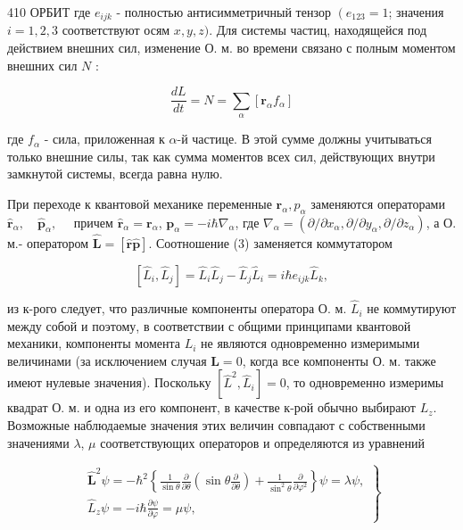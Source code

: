 \documentclass[10pt]{article}
\begin{document}
410 ОРБИТ где $e_{i j k}$ - полностью антисимметричный тензор $\left(e_{123}=1\right.$; значения $i=1,2,3$ соответствуют осям $x, y, z)$. Для системы частиц, находящейся под действием внешних сил, изменение О. м. во времени связано с полным моментом внешних сил $N$ :



\[

\frac{d L}{d t}=N=\sum_{\alpha}\left[\boldsymbol{r}_{\alpha} f_{\alpha}\right]

\]



где $f_{\alpha}$ - сила, приложенная к $\alpha$-й частице. В этой сумме должны учитываться только внешние силы, так как сумма моментов всех сил, действующих внутри замкнутой системы, всегда равна нулю.



При переходе к квантовой механике переменные $\boldsymbol{r}_{\alpha}, p_{\alpha}$ заменяются операторами $\hat{\boldsymbol{r}}_{\alpha}, \quad \hat{\boldsymbol{p}}_{\alpha}, \quad$ причем $\hat{\boldsymbol{r}}_{\alpha}=\boldsymbol{r}_{\alpha}$, $\boldsymbol{p}_{\alpha}=-i \hbar \nabla_{\alpha}$, где $\nabla_{\alpha}=\left(\partial / \partial x_{\alpha}, \partial / \partial y_{\alpha}, \partial / \partial z_{\alpha}\right)$, а О. м.- оператором $\hat{\boldsymbol{L}}=[\hat{\boldsymbol{r}} \hat{\boldsymbol{p}}]$. Соотношение (3) заменяется коммутатором



\[

\left[\hat{L}_{i}, \hat{L}_{j}\right]=\hat{L}_{i} \hat{L}_{j}-\hat{L}_{j} \hat{L}_{i}=i \hbar e_{i j k} \hat{L}_{k},

\]



из к-рого следует, что различные компоненты оператора О. м. $\hat{L}_{i}$ не коммутируют между собой и поэтому, в соответствии с общими принципами квантовой механики, компоненты момента $L_{i}$ не являются одновременно измеримыми величинами (за исключением случая $\boldsymbol{L}=0$, когда все компоненты О. м. также имеют нулевые значения). Поскольку $\left[\hat{L}^{2}, \hat{L}_{i}\right]=0$, то одновременно измеримы квадрат О. м. и одна из его компонент, в качестве к-рой обычно выбирают $L_{z}$. Возможные наблюдаемые значения этих величин совпадают с собственными значениями $\lambda$, $\mu$ соответствующих операторов и определяются из уравнений



\[

\left.\begin{array}{c}

\hat{\boldsymbol{L}}^{2} \psi=-\hbar^{2}\left\{\frac{1}{\sin \theta} \frac{\partial}{\partial \theta}\left(\sin \theta \frac{\partial}{\partial \theta}\right)+\frac{1}{\sin ^{2} \theta} \frac{\partial}{\partial \varphi^{2}}\right\} \psi=\lambda \psi, \\

\hat{L}_{z} \psi=-i \hbar \frac{\partial \psi}{\partial \varphi}=\mu \psi,

\end{array}\right\}

\]
\end{document}
